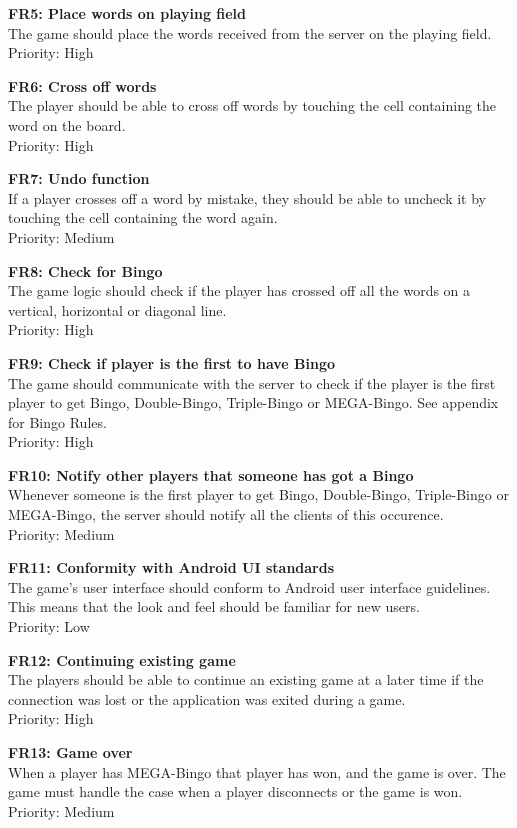 {\bf FR5: Place words on playing field}\\
The game should place the words received from the server on the playing
field.\\
Priority: High

{\bf FR6: Cross off words}\\
The player should be able to cross off words by touching the cell containing
the word on the board.\\
Priority: High

{\bf FR7: Undo function}\\
If a player crosses off a word by mistake, they should be able to uncheck it by
touching the cell containing the word again.\\
Priority: Medium

{\bf FR8: Check for Bingo}\\
The game logic should check if the player has crossed off all the words on a
vertical, horizontal or diagonal line.\\
Priority: High

{\bf FR9: Check if player is the first to have Bingo}\\
The game should communicate with the server to check if the player is the first
player to get Bingo, Double-Bingo, Triple-Bingo or MEGA-Bingo. See appendix for
Bingo Rules.\\
Priority: High

{\bf FR10: Notify other players that someone has got a Bingo}\\
Whenever someone is the first player to get Bingo, Double-Bingo, Triple-Bingo
or MEGA-Bingo, the server should notify all the clients of this occurence.\\
Priority: Medium

{\bf FR11: Conformity with Android UI standards}\\
The game's user interface should conform to Android user interface guidelines.
This means that the look and feel should be familiar for new users.\\
Priority: Low

{\bf FR12: Continuing existing game}\\
The players should be able to continue an existing game at a later time if the
connection was lost or the application was exited during a game.\\
Priority: High

{\bf FR13: Game over}\\
When a player has MEGA-Bingo that player has won, and the game is over. The
game must handle the case when a player disconnects or the game is won.\\
Priority: Medium

